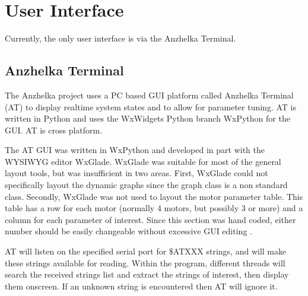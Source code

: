 \documentclass{article}
\numberwithin{equation}{section} %
\begin{document}





 
\section{User Interface}
Currently, the only user interface is via the Anzhelka Terminal.
\subsection{Anzhelka Terminal}
The Anzhelka project uses a PC based GUI platform called Anzhelka Terminal (AT) to display realtime system states and to allow for parameter tuning. AT is written in Python and uses the WxWidgets Python branch WxPython for the GUI. AT is cross platform.

The AT GUI was written in WxPython and developed in part with the WYSIWYG editor WxGlade. WxGlade was suitable for most of the general layout tools, but was insufficient in two areas. First, WxGlade could not specifically layout the dynamic graphs since the graph class is a non standard class. Secondly, WxGlade was not used to layout the motor parameter table. This table has a row for each motor (normally 4 motors, but possibly 3 or more) and a column for each parameter of interest. Since this section was hand coded, either number should be easily changeable without excessive GUI editing .

AT will listen on the specified serial port for \$ATXXX strings, and will  make these strings available for reading. Within the program, different threads will search the received strings list and extract the strings of interest, then display them onscreen. If an unknown string is encountered then AT will ignore it.
\end{document}
